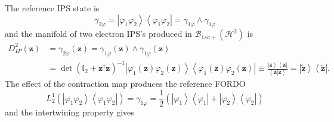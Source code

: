 \documentclass[aps,preprint]{revtex4}%
\begin{document}
The reference IPS state is
\begin{equation}
\gamma_{2\varphi}=\left\vert \varphi_{1}\varphi_{2}\right\rangle \left\langle
\varphi_{1}\varphi_{2}\right\vert =\gamma_{1\varphi}\wedge\gamma_{1\varphi}%
\end{equation}
and the manifold of two electron IPS's produced in $\mathcal{B}_{1sa+}\left(
\mathcal{H}^{2}\right)  $ is
\begin{align}
D_{IP}^{2}\left(  \mathbf{z}\right)   &  =\gamma_{2\varphi}\left(
\mathbf{z}\right)  =\gamma_{1\varphi}\left(  \mathbf{z}\right)  \wedge
\gamma_{1\varphi}\left(  \mathbf{z}\right) \nonumber\\
&  =\det\left(  \mathbb{I}_{2}+\mathbf{z}^{\dagger}\mathbf{z}\right)
^{-1}\left\vert \varphi_{1}\left(  \mathbf{z}\right)  \varphi_{2}\left(
\mathbf{z}\right)  \right\rangle \left\langle \varphi_{1}\left(
\mathbf{z}\right)  \varphi_{2}\left(  \mathbf{z}\right)  \right\vert
\equiv\frac{\left\vert \mathbf{z}\right\rangle \left\langle \mathbf{z}%
\right\vert }{\left\langle \mathbf{z}\left\vert \mathbf{z}\right.
\right\rangle }=\left\vert \mathbf{\tilde{z}}\right\rangle \left\langle
\mathbf{\tilde{z}}\right\vert .
\end{align}
The effect of the contraction map produces the reference FORDO\
\begin{equation}
L_{2}^{1}\left(  \left\vert \varphi_{1}\varphi_{2}\right\rangle \left\langle
\varphi_{1}\varphi_{2}\right\vert \right)  =\gamma_{1\varphi}=\frac{1}%
{2}\left(  \left\vert \varphi_{1}\right\rangle \left\langle \varphi
_{1}\right\vert +\left\vert \varphi_{2}\right\rangle \left\langle \varphi
_{2}\right\vert \right)
\end{equation}
and the intertwining property gives
\end{document}
